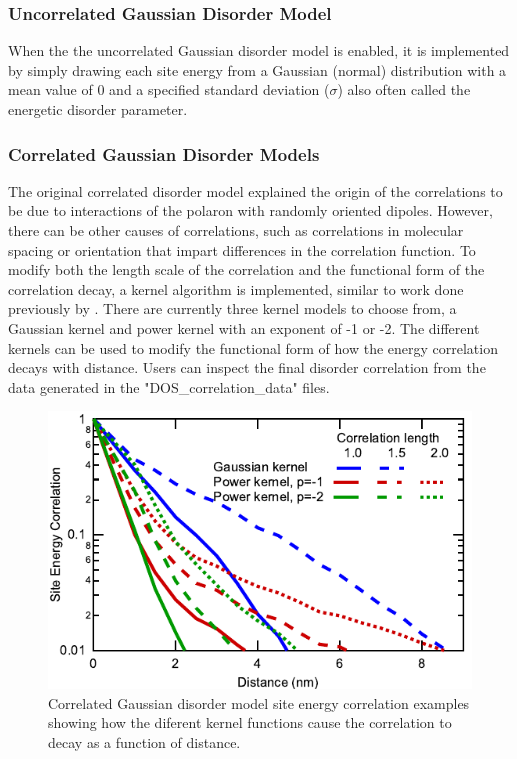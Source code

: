 \documentclass[%
 reprint,onecolumn,notitlepage,
superscriptaddress,longbibliography,
 amsmath,amssymb,
 aps,rmp,floatfix,
]{revtex4-1}
\begin{document}
\subsubsection{Uncorrelated Gaussian Disorder Model}

When the the uncorrelated Gaussian disorder model is enabled, it is implemented by simply drawing each site energy from a Gaussian (normal) distribution with a mean value of 0 and a specified standard deviation ($\sigma$) also often called the energetic disorder parameter. 

\subsubsection{Correlated Gaussian Disorder Models}

The original correlated disorder model explained the origin of the correlations to be due to interactions of the polaron with randomly oriented dipoles.\cite{gartstein1995cpl,novikov1998prl}
However, there can be other causes of correlations, such as correlations in molecular spacing or orientation that impart differences in the correlation function.\cite{kordt2014jctc}  
To modify both the length scale of the correlation and the functional form of the correlation decay, a kernel algorithm is implemented, similar to work done previously by \citeauthor{gartstein1995cpl}.\cite{gartstein1995cpl}
There are currently three kernel models to choose from, a Gaussian kernel and power kernel with an exponent of -1  or -2.
The different kernels can be used to modify the functional form of how the energy correlation decays with distance.
Users can inspect the final disorder correlation from the data generated in the "DOS\_correlation\_data" files.

\begin{figure}[h]
    \centering
    \includegraphics{DOS_correlation_comparison.pdf}
    \caption{Correlated Gaussian disorder model site energy correlation examples showing how the diferent kernel functions cause the correlation to decay as a function of distance.}
    \label{fig:correlation_data}
\end{figure}
\end{document}
